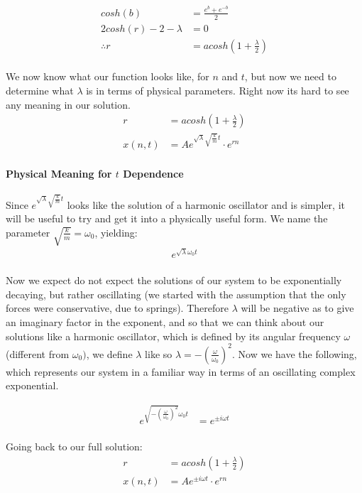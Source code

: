 \documentclass{article}
\begin{document}
	\begin{align}
		cosh(b) &= \frac{e^{b} + e^{-b}}{2}\\ \label{eq:cosh}
		2cosh(r) - 2 - \lambda &= 0\\
		\therefore r &= acosh(1 + \frac{\lambda}{2})
	\end{align}
	\paragraph{}
	We now know what our function looks like, for $n$ and $t$, but now we need to determine what $\lambda$ is in terms of physical parameters. Right now its hard to see any meaning in our solution.
	\begin{align}
		r &= acosh(1 + \frac{\lambda}{2})\\
		x(n,t) &= Ae^{\sqrt{\lambda} \sqrt{\frac{k}{m}}t} \cdot e^{rn}
	\end{align}
	\paragraph{Physical Meaning for $t$ Dependence}
Since $e^{\sqrt{\lambda}\sqrt{\frac{k}{m}}t}$ looks like the solution of a harmonic oscillator and is simpler, it will be useful to try and get it into a physically useful form. We name the parameter $\sqrt{\frac{k}{m}} = \omega_{0}$, yielding:
	\begin{align}
		e^{\sqrt{\lambda}\omega_{0}t}
	\end{align}
	\paragraph{}
		Now we expect do not expect the solutions of our system to be exponentially decaying, but rather oscillating (we started with the assumption that the only forces were conservative, due to springs). Therefore $\lambda$ will be negative as to give an imaginary factor in the exponent, and so that we can think about our solutions like a harmonic oscillator, which is defined by its angular frequency $\omega$ (different from $\omega_{0})$, we define $\lambda$ like so $\lambda = -(\frac{\omega}{\omega_{0}})^{2}$. Now we have the following, which represents our system in a familiar way in terms of an oscillating complex exponential.

	\begin{align}
		e^{\sqrt{-(\frac{\omega}{\omega_{0}})^{2}}\omega_{0}t} &= 	e^{\pm i \omega t}
	\end{align}
	\paragraph{}
	Going back to our full solution:
	\begin{align}
		r &= acosh(1 + \frac{\lambda}{2})\\
		x(n,t) &= Ae^{\pm i \omega t} \cdot e^{rn}
	\end{align}
\end{document}

